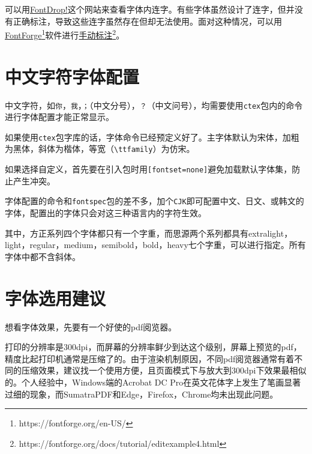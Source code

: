 \documentclass[10pt,openany]{book}
\begin{document}
可以用\href{https://fontdrop.info}{FontDrop!}这个网站来查看字体内连字。有些字体虽然设计了连字，但并没有正确标注，导致这些连字虽然存在但却无法使用。面对这种情况，可以用\href{https://fontforge.org/en-US/}{FontForge\footnote{https://fontforge.org/en-US/}}软件进行\href{https://fontforge.org/docs/tutorial/editexample4.html}{手动标注\footnote{https://fontforge.org/docs/tutorial/editexample4.html}}。

\section{中文字符字体配置}

中文字符，如\texttt{你}，\texttt{我}，\texttt{；}（中文分号），\texttt{？}（中文问号），均需要使用\texttt{ctex}包内的命令进行字体配置才能正常显示。

如果使用\texttt{ctex}包字库的话，字体命令已经预定义好了。主字体默认为宋体，加粗为黑体，斜体为楷体，等宽（\texttt{\textbackslash{}ttfamily}）为仿宋。



如果选择自定义，首先要在引入包时用\texttt{[fontset=none]}避免加载默认字体集，防止产生冲突。



字体配置的命令和\texttt{fontspec}包的差不多，加个\texttt{CJK}即可配置中文、日文、或韩文的字体，配置出的字体只会对这三种语言内的字符生效。



其中，方正系列四个字体都只有一个字重，而思源两个系列都具有extralight，light，regular，medium，semibold，bold，heavy七个字重，可以进行指定。所有字体中都不含斜体。

\section{字体选用建议}

想看字体效果，先要有一个好使的pdf阅览器。

打印的分辨率是300dpi，而屏幕的分辨率鲜少到达这个级别，屏幕上预览的pdf，精度比起打印机通常是压缩了的。由于渲染机制原因，不同pdf阅览器通常有着不同的压缩效果，建议找一个使用方便，且页面模式下与放大到300dpi下效果最相似的。个人经验中，Windows端的Acrobat DC Pro在英文花体字上发生了笔画显著过细的现象，而SumatraPDF和Edge，Firefox，Chrome均未出现此问题。
\end{document}
